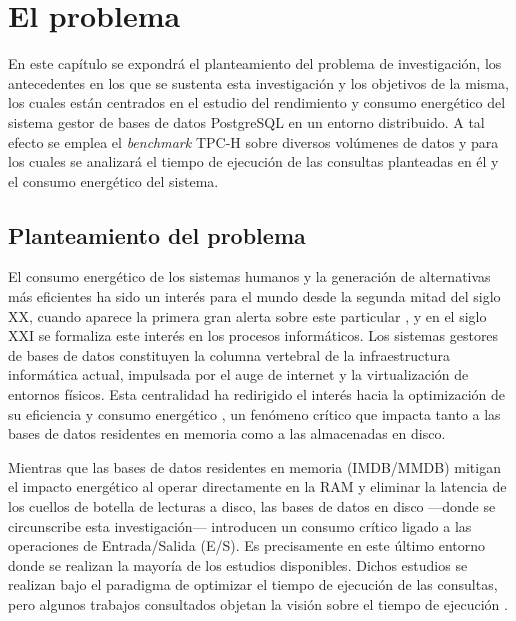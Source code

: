 \documentclass[12pt, letter paper]{report}
\begin{document}
  \chapter{El problema} %
  \label{cha:el_problema}
    En este capítulo se expondrá el planteamiento del problema de investigación,
    los antecedentes en los que se sustenta esta investigación y los objetivos
    de la misma, los cuales están centrados en el estudio del rendimiento y
    consumo energético del sistema gestor de bases de datos PostgreSQL en un
    entorno distribuido. A tal efecto se emplea el \textit{benchmark} TPC-H
    sobre diversos volúmenes de datos y para los cuales se analizará el tiempo
    de ejecución de las consultas planteadas en él y el consumo energético del
    sistema.

    \section{Planteamiento del problema} %
    \label{sec:planteamiento_del_problema}
      El consumo energético de los sistemas humanos y la generación de
      alternativas más eficientes ha sido un interés para el mundo desde la
      segunda mitad del siglo XX, cuando aparece la primera gran alerta sobre
      este particular \cite{repashleyhr84441977, horowitzpurchased2014}, y en el
      siglo XXI \cite{murugesangoing2007} se formaliza este interés en los
      procesos informáticos. Los sistemas gestores de bases de datos constituyen
      la columna vertebral de la infraestructura informática actual, impulsada
      por el auge de internet y la virtualización de entornos físicos. Esta
      centralidad ha redirigido el interés hacia la optimización de su
      eficiencia y consumo energético \cite{bunseenergy2014}, un fenómeno
      crítico que impacta tanto a las bases de datos residentes en memoria como
      a las almacenadas en disco.

      Mientras que las bases de datos residentes en memoria (IMDB/MMDB)
      \cite{pisharathreducing2004, nollenergy2017} mitigan el impacto energético
      al operar directamente en la RAM y eliminar la latencia de los cuellos de
      botella de lecturas a disco, las bases de datos en disco ---donde se
      circunscribe esta investigación--- introducen un consumo crítico ligado a
      las operaciones de Entrada/Salida (E/S). Es precisamente en este último
      entorno donde se realizan la mayoría de los estudios disponibles. Dichos
      estudios se realizan bajo el paradigma de optimizar el tiempo de ejecución
      de las consultas, pero algunos trabajos consultados objetan la visión
      sobre el tiempo de ejecución \cite{xuexploring2010, langtowards2009,
      langrethinking2011}.
\end{document}
